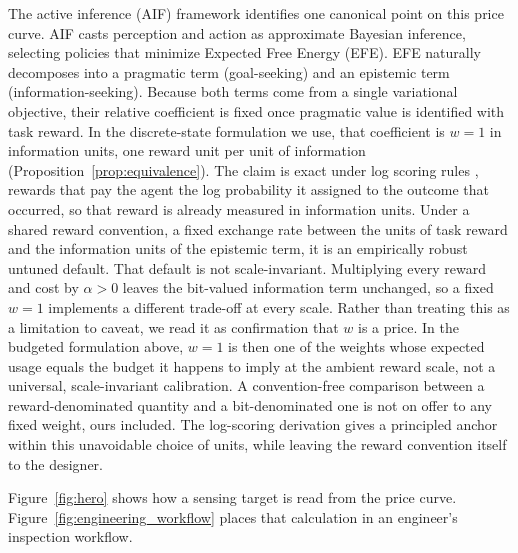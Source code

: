 The active inference (AIF) framework \citep{friston2010, parr2019} identifies one canonical point on this price curve. AIF casts perception and action as approximate Bayesian inference, selecting policies that minimize Expected Free Energy (EFE). EFE naturally decomposes into a pragmatic term (goal-seeking) and an epistemic term (information-seeking). Because both terms come from a single variational objective, their relative coefficient is fixed once pragmatic value is identified with task reward. In the discrete-state formulation we use, that coefficient is $w{=}1$ in information units, one reward unit per unit of information (Proposition~\ref{prop:equivalence}). The claim is exact under log scoring rules \citep{bernardo1979}, rewards that pay the agent the log probability it assigned to the outcome that occurred, so that reward is already measured in information units. Under a shared reward convention, a fixed exchange rate between the units of task reward and the information units of the epistemic term, it is an empirically robust untuned default. That default is not scale-invariant. Multiplying every reward and cost by $\alpha>0$ leaves the bit-valued information term unchanged, so a fixed $w{=}1$ implements a different trade-off at every scale. Rather than treating this as a limitation to caveat, we read it as confirmation that $w$ is a price. In the budgeted formulation above, $w{=}1$ is then one of the weights whose expected usage equals the budget it happens to imply at the ambient reward scale, not a universal, scale-invariant calibration. A convention-free comparison between a reward-denominated quantity and a bit-denominated one is not on offer to any fixed weight, ours included. The log-scoring derivation gives a principled anchor within this unavoidable choice of units, while leaving the reward convention itself to the designer.

Figure~\ref{fig:hero} shows how a sensing target is read from the price curve. Figure~\ref{fig:engineering_workflow} places that calculation in an engineer's inspection workflow.

